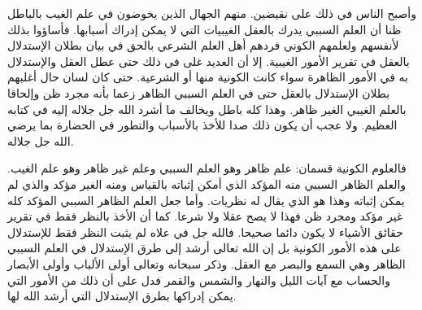 وأصبح الناس في ذلك على نقيضين. منهم الجهال الذين يخوضون في علم الغيب بالباطل ظنا أن العلم السببي يدرك بالعقل الغيبيات التي لا يمكن إدراك أسبابها. فأساؤوا بذلك لأنفسهم ولعلمهم الكوني فردهم أهل العلم الشرعي بالحق في بيان بطلان الإستدلال بالعقل في تقرير الأمور الغيبية. إلا أن العديد غلى في ذلك حتى عطل العقل والإستدلال به في الأمور الظاهرة سواء كانت الكونية منها أو الشرعية. حتى كان لسان حال أغلبهم بطلان الإستدلال بالعقل حتى في العلم السببي الظاهر زعما بأنه مجرد ظن وإلحاقا بالعلم الغيبي الغير ظاهر. وهذا كله باطل ويخالف ما أشرد الله جل جلاله إليه في كتابه العظيم. ولا عجب أن يكون ذلك صدا للأخذ بالأسباب والتطور في الحضارة بما يرضي الله جل جلاله. 

فالعلوم الكونية قسمان: علم ظاهر وهو العلم السببي وعلم غير ظاهر وهو علم الغيب. والعلم الظاهر السببي منه المؤكد الذي أمكن إثباته بالقياس ومنه الغير مؤكد والذي لم يمكن إثباته وهذا هو الذي يقال له نظريات. وأما جعل العلم الظاهر السببي المؤكد كله غير مؤكد ومجرد ظن فهذا لا يصح عقلا ولا شرعا. كما أن الأخذ بالنظر فقط في تقرير حقائق الأشياء لا يكون دائما صحيحا. فالله جل في علاه لم يثبت النظر فقط للإستدلال على هذه الأمور الكونية بل إن الله تعالى أرشد إلى طرق الإستدلال في العلم السببي الظاهر وهي السمع والبصر مع العقل. وذكر سبحانه وتعالى أولى الألباب وأولى الأبصار والحساب مع آيات الليل والنهار والشمس والقمر فدل على أن ذلك من الأمور التي يمكن إدراكها بطرق الإستدلال التي أرشد الله لها.

